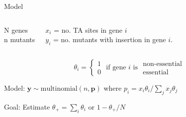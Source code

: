 \documentclass[aspectratio=169,12pt,t]{beamer}
\begin{document}
\begin{frame}{Model}

\begin{columns}


N genes \\[12pt]

n mutants


$x_i$ = no. TA sites in gene $i$ \\[12pt]

$y_i$ = no. mutants with insertion in gene $i$.
\end{columns}


\bigskip\bigskip\bigskip

  $$  \theta_i = \left\{ \begin{array}{c} 1 \\ 0 \end{array} \text{ if gene $i$ is  }
      \begin{array}{c} \text{non-essential}  \\ \text{essential} \end{array} \right. $$


      \bigskip\bigskip\bigskip

      {\color{title} Model}: $\boldsymbol{y} \sim
      \text{multinomial}(n,\boldsymbol{p})$ \qquad where $p_i = x_i  \theta_i / \sum_j x_j \theta_j$

\bigskip\bigskip

      {\color{title} Goal}: Estimate $\theta_+ = \sum_i \theta_i$
      \qquad or \qquad $1 - \theta_+/N$

  \note{
  }
\end{frame}
\end{document}
